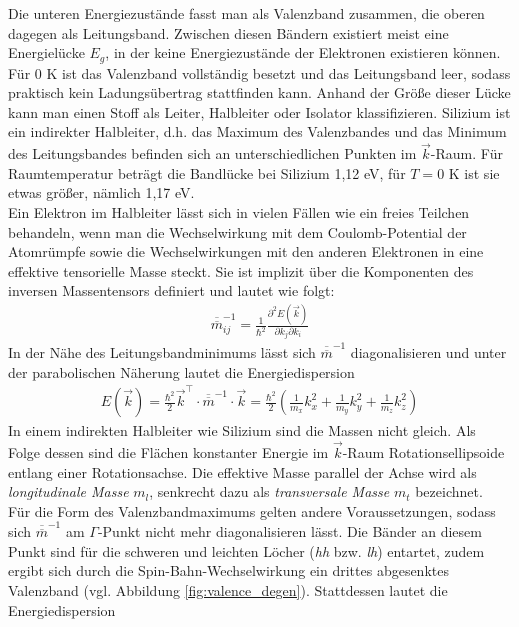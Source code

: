 \documentclass[a4paper,12pt]{article}
\begin{document}
Die unteren Energiezustände fasst man als Valenzband zusammen, die oberen dagegen als Leitungsband. Zwischen diesen Bändern existiert meist eine Energielücke $E_g$, in der keine Energiezustände der Elektronen existieren können. 
Für 0 K ist das Valenzband vollständig besetzt und das Leitungsband leer, sodass praktisch kein Ladungsübertrag stattfinden kann. 
Anhand der Größe dieser Lücke kann man einen Stoff als Leiter, Halbleiter oder Isolator klassifizieren. Silizium ist ein indirekter Halbleiter, d.h. das Maximum des Valenzbandes und das Minimum des Leitungsbandes befinden sich an unterschiedlichen Punkten im $\vec{k}$-Raum. Für Raumtemperatur beträgt die Bandlücke bei Silizium 1,12 eV, für $T=0$ K ist sie etwas größer, nämlich 1,17 eV.\\
Ein Elektron im Halbleiter lässt sich in vielen Fällen wie ein freies Teilchen behandeln, wenn man die Wechselwirkung mit dem Coulomb-Potential der Atomrümpfe sowie die Wechselwirkungen mit den anderen Elektronen in eine effektive tensorielle Masse steckt. Sie ist implizit über die Komponenten des inversen Massentensors definiert und lautet wie folgt:
\begin{align}
\overline{\overline{m}}_{ij}^{-1}=\frac{1}{\hbar^2}\frac{\partial^2 E(\vec{k})}{\partial k_j \partial k_i}
\end{align}
In der Nähe des Leitungsbandminimums lässt sich $\overline{\overline{m}}^{-1}$ diagonalisieren und unter der parabolischen Näherung lautet die Energiedispersion
\begin{align}
E(\vec{k})=\frac{\hbar^2}{2}\vec{k}^\intercal\cdot \overline{\overline{m}}^{-1}\cdot \vec{k}=\frac{\hbar^2}{2}\left(\frac{1}{m_x}k_x^2+\frac{1}{m_y}k_y^2+\frac{1}{m_z}k_z^2\right)
\end{align}
In einem indirekten Halbleiter wie Silizium sind die Massen nicht gleich. Als Folge dessen sind die Flächen konstanter Energie im $\vec{k}$-Raum Rotationsellipsoide entlang einer Rotationsachse. Die effektive Masse parallel der Achse wird als \emph{longitudinale Masse} $m_l$, senkrecht dazu als \emph{transversale Masse} $m_t$ bezeichnet.\\
Für die Form des Valenzbandmaximums gelten andere Voraussetzungen, sodass sich $\overline{\overline{m}}^{-1}$ am $\Gamma$-Punkt nicht mehr diagonalisieren lässt. Die Bänder an diesem Punkt sind für die schweren und leichten Löcher (\emph{hh} bzw. \emph{lh}) entartet, zudem ergibt sich durch die Spin-Bahn-Wechselwirkung ein drittes abgesenktes Valenzband (vgl. Abbildung \ref{fig:valence_degen}).
Stattdessen lautet die Energiedispersion
\end{document}
